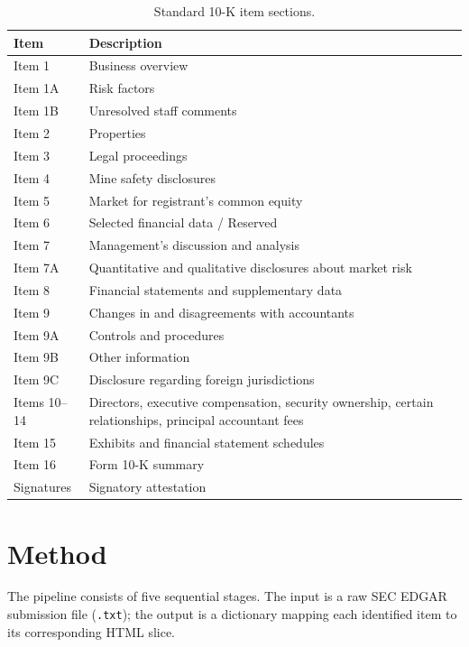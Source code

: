 \documentclass[12pt,letterpaper,oneside]{article}
\begin{document}
\begin{table}[htbp]
\centering
\caption{Standard 10-K item sections.}\label{tab:items}
\begin{tabu}{lX}
\toprule
\textbf{Item} & \textbf{Description} \\
\midrule
Item 1      & Business overview \\
Item 1A     & Risk factors \\
Item 1B     & Unresolved staff comments \\
Item 2      & Properties \\
Item 3      & Legal proceedings \\
Item 4      & Mine safety disclosures \\
Item 5      & Market for registrant's common equity \\
Item 6      & Selected financial data / Reserved \\
Item 7      & Management's discussion and analysis \\
Item 7A     & Quantitative and qualitative disclosures about market risk \\
Item 8      & Financial statements and supplementary data \\
Item 9      & Changes in and disagreements with accountants \\
Item 9A     & Controls and procedures \\
Item 9B     & Other information \\
Item 9C     & Disclosure regarding foreign jurisdictions \\
Items 10--14 & Directors, executive compensation, security ownership,
              certain relationships, principal accountant fees \\
Item 15     & Exhibits and financial statement schedules \\
Item 16     & Form 10-K summary \\
Signatures  & Signatory attestation \\
\bottomrule
\end{tabu}
\end{table}


\section{Method}\label{sec:method}

The pipeline consists of five sequential stages. The input is a raw
SEC EDGAR submission file (\texttt{.txt}); the output is a dictionary
mapping each identified item to its corresponding HTML slice.
\end{document}
